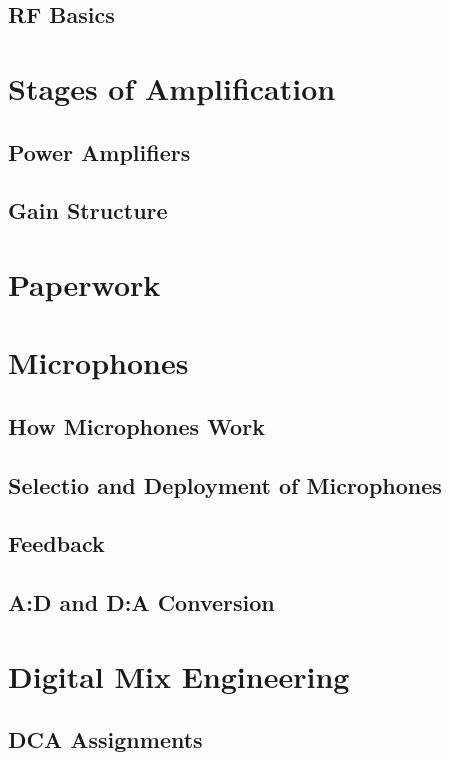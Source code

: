 \documentclass[a4paper]{article}
\begin{document}
\subsection{RF Basics}

\section{Stages of Amplification}

\subsection{Power Amplifiers}

\subsection{Gain Structure}

\section{Paperwork}

\section{Microphones}

\subsection{How Microphones Work}

\subsection{Selectio and Deployment of Microphones}

\subsection{Feedback}

\subsection{A:D and D:A Conversion}

\section{Digital Mix Engineering}

\subsection{DCA Assignments}
\end{document}
